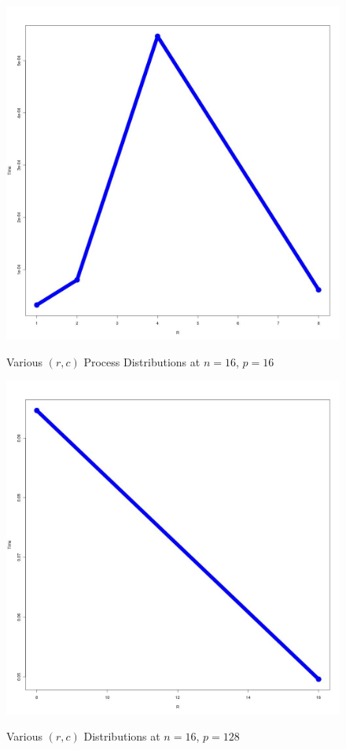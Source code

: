 \documentclass[12pt]{article}
\begin{document}
\begin{figure}[H]
\centering
\caption{Various $(r, c)$ Process Distributions at $n=16$, $p=16$}
\includegraphics[scale=0.3]{candidate-graphs/mpi_p1_vary_process_16-16.jpg}
\label{mpi_p1_16_16}
\end{figure}

\begin{figure}[H]
\centering
\caption{Various $(r, c)$ Distributions at $n=16$, $p=128$}
\includegraphics[scale=0.3]{candidate-graphs/mpi_p1_vary_process_16-128.jpg}
\label{mpi_p1_16_128}
\end{figure}
\end{document}
